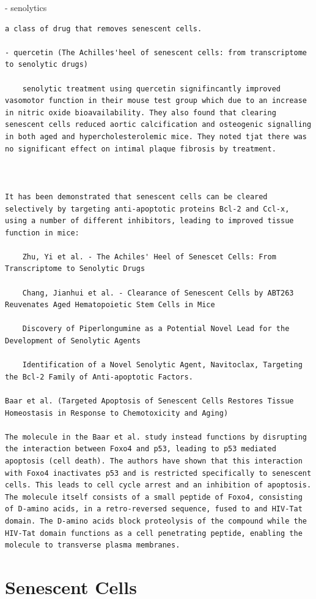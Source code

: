 \documentclass[
]{book}
\begin{document}
- senolytics

\begin{verbatim}
a class of drug that removes senescent cells.

- quercetin (The Achilles'heel of senescent cells: from transcriptome to senolytic drugs)

    senolytic treatment using quercetin signifincantly improved vasomotor function in their mouse test group which due to an increase in nitric oxide bioavailability. They also found that clearing senescent cells reduced aortic calcification and osteogenic signalling in both aged and hypercholesterolemic mice. They noted tjat there was no significant effect on intimal plaque fibrosis by treatment.



It has been demonstrated that senescent cells can be cleared selectively by targeting anti-apoptotic proteins Bcl-2 and Ccl-x, using a number of different inhibitors, leading to improved tissue function in mice:

    Zhu, Yi et al. - The Achiles' Heel of Senescet Cells: From Transcriptome to Senolytic Drugs

    Chang, Jianhui et al. - Clearance of Senescent Cells by ABT263 Reuvenates Aged Hematopoietic Stem Cells in Mice

    Discovery of Piperlongumine as a Potential Novel Lead for the Development of Senolytic Agents

    Identification of a Novel Senolytic Agent, Navitoclax, Targeting the Bcl-2 Family of Anti-apoptotic Factors.

Baar et al. (Targeted Apoptosis of Senescent Cells Restores Tissue Homeostasis in Response to Chemotoxicity and Aging)

The molecule in the Baar et al. study instead functions by disrupting the interaction between Foxo4 and p53, leading to p53 mediated apoptosis (cell death). The authors have shown that this interaction with Foxo4 inactivates p53 and is restricted specifically to senescent cells. This leads to cell cycle arrest and an inhibition of apoptosis. The molecule itself consists of a small peptide of Foxo4, consisting of D-amino acids, in a retro-reversed sequence, fused to and HIV-Tat domain. The D-amino acids block proteolysis of the compound while the HIV-Tat domain functions as a cell penetrating peptide, enabling the molecule to transverse plasma membranes.
\end{verbatim}

\hypertarget{senescent-cells}{%
\section{Senescent Cells}\label{senescent-cells}}
\end{document}
